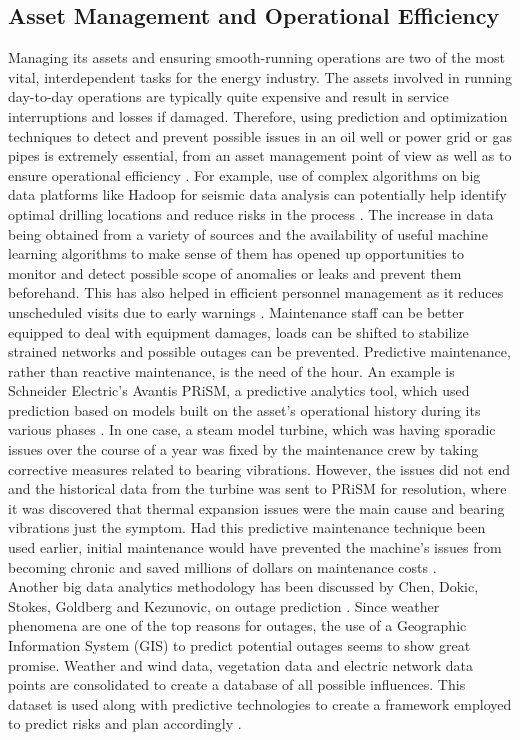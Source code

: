 \subsection{Asset Management and Operational Efficiency}
Managing its assets and ensuring smooth-running operations are two of the most vital, interdependent tasks for the energy industry. The assets involved in running day-to-day operations are typically quite expensive and result in service interruptions and losses if damaged. Therefore, using prediction and optimization techniques to detect and prevent possible issues in an oil well or power grid or gas pipes is extremely essential, from an asset management point of view as well as to ensure operational efficiency \cite{info12}. For example, use of complex algorithms on big data platforms like Hadoop for seismic data analysis can potentially help identify optimal drilling locations and reduce risks in the process \cite{acc15}. The increase in data being obtained from a variety of sources and the availability of useful machine learning algorithms to make sense of them has opened up opportunities to monitor and detect possible scope of anomalies or leaks and prevent them beforehand. This has also helped in efficient personnel management as it reduces unscheduled visits due to early warnings \cite{schneider13}. Maintenance staff can be better equipped to deal with equipment damages, loads can be shifted to stabilize strained networks and possible outages can be prevented. Predictive maintenance, rather than reactive maintenance, is the need of the hour. An example is Schneider Electric's Avantis PRiSM, a predictive analytics tool, which used prediction based on models built on the asset's operational history during its various phases \cite{schneider13}. In one case, a steam model turbine, which was having sporadic issues over the course of a year was fixed by the maintenance crew by taking corrective measures related to bearing vibrations. However, the issues did not end and the historical data from the turbine was sent to PRiSM for resolution, where it was discovered that thermal expansion issues were the main cause and bearing vibrations just the symptom. Had this predictive maintenance technique been used earlier, initial maintenance would have prevented the machine's issues from becoming chronic and saved millions of dollars on maintenance costs \cite{schneider13}.\\
Another big data analytics methodology has been discussed by Chen, Dokic, Stokes, Goldberg and Kezunovic, on outage prediction \cite{chen14}. Since weather phenomena are one of the top reasons for outages, the use of a Geographic Information System (GIS) to predict potential outages seems to show great promise. Weather and wind data, vegetation data and electric network data points are consolidated to create a database of all possible influences. This dataset is used along with predictive technologies to create a framework employed to predict risks and plan accordingly \cite{chen14}.\\
